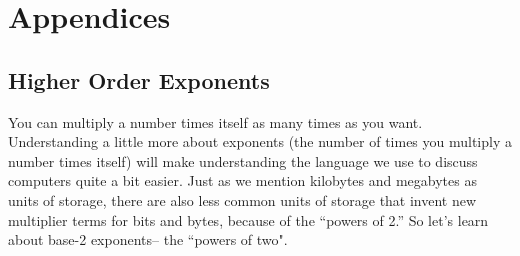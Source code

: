 
\section{Appendices}


\subsection*{Higher Order Exponents}

You can multiply a number times itself as many times as you want. Understanding a little more about exponents (the number of times you multiply a number times itself) will make understanding the language we use to discuss computers quite a bit easier. Just as we mention kilobytes and megabytes as units of storage, there are also less common units of storage that invent new multiplier terms for bits and bytes, because of the ``powers of 2.'' So let's learn about base-2 exponents-- the ``powers of two".

\newcommand{\expline}[2]{
$2^{#1}$ & = & #2 
}

